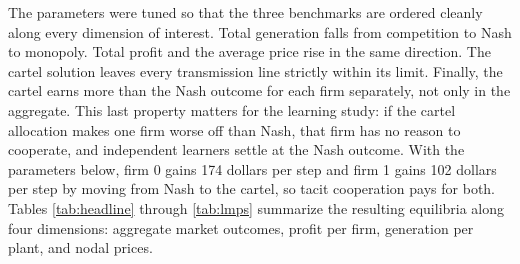 \documentclass[lettersize,journal]{IEEEtran}
\begin{document}
The parameters were tuned so that the three benchmarks are ordered cleanly along every dimension of interest. Total generation falls from competition to Nash to monopoly. Total profit and the average price rise in the same direction. The cartel solution leaves every transmission line strictly within its limit. Finally, the cartel earns more than the Nash outcome for each firm separately, not only in the aggregate. This last property matters for the learning study: if the cartel allocation makes one firm worse off than Nash, that firm has no reason to cooperate, and independent learners settle at the Nash outcome. With the parameters below, firm 0 gains 174 dollars per step and firm 1 gains 102 dollars per step by moving from Nash to the cartel, so tacit cooperation pays for both. Tables \ref{tab:headline} through \ref{tab:lmps} summarize the resulting equilibria along four dimensions: aggregate market outcomes, profit per firm, generation per plant, and nodal prices.
\end{document}
